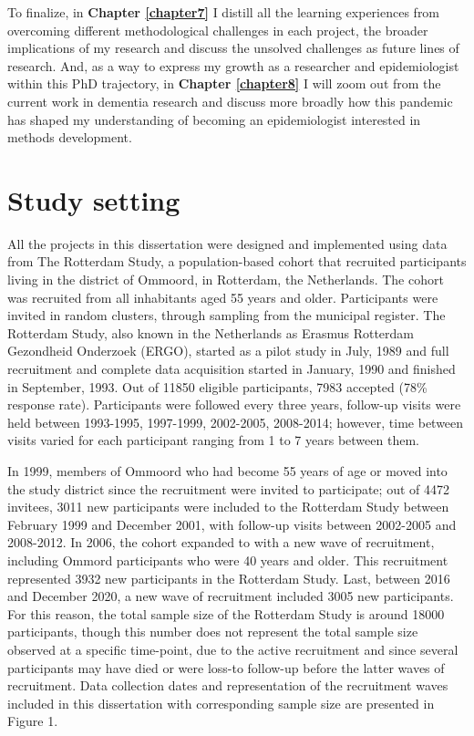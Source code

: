 \documentclass[
]{book}
\begin{document}
To finalize, in \textbf{Chapter \ref{chapter7}} I distill all the learning experiences from overcoming different methodological challenges in each project, the broader implications of my research and discuss the unsolved challenges as future lines of research. And, as a way to express my growth as a researcher and epidemiologist within this PhD trajectory, in \textbf{Chapter \ref{chapter8}} I will zoom out from the current work in dementia research and discuss more broadly how this pandemic has shaped my understanding of becoming an epidemiologist interested in methods development.

\newpage

\hypertarget{study-setting}{%
\section{Study setting}\label{study-setting}}

All the projects in this dissertation were designed and implemented using data from The Rotterdam Study, a population-based cohort that recruited participants living in the district of Ommoord, in Rotterdam, the Netherlands. The cohort was recruited from all inhabitants aged 55 years and older. Participants were invited in random clusters, through sampling from the municipal register\autocite{hofman1991}. The Rotterdam Study, also known in the Netherlands as Erasmus Rotterdam Gezondheid Onderzoek (ERGO), started as a pilot study in July, 1989 and full recruitment and complete data acquisition started in January, 1990 and finished in September, 1993. Out of 11850 eligible participants, 7983 accepted (78\% response rate). Participants were followed every three years, follow-up visits were held between 1993-1995, 1997-1999, 2002-2005, 2008-2014; however, time between visits varied for each participant ranging from 1 to 7 years between them.

In 1999, members of Ommoord who had become 55 years of age or moved into the study district since the recruitment were invited to participate; out of 4472 invitees, 3011 new participants were included to the Rotterdam Study \autocite{hofman2007} between February 1999 and December 2001, with follow-up visits between 2002-2005 and 2008-2012. In 2006, the cohort expanded to with a new wave of recruitment, including Ommord participants who were 40 years and older. This recruitment represented 3932 new participants in the Rotterdam Study. Last, between 2016 and December 2020, a new wave of recruitment included 3005 new participants. For this reason, the total sample size of the Rotterdam Study is around 18000 participants, though this number does not represent the total sample size observed at a specific time-point, due to the active recruitment and since several participants may have died or were loss-to follow-up before the latter waves of recruitment. Data collection dates and representation of the recruitment waves included in this dissertation with corresponding sample size are presented in Figure 1.
\end{document}
